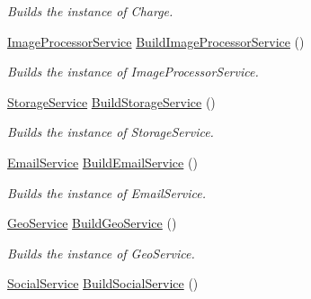\begin{DoxyCompactItemize}
\begin{DoxyCompactList}\small\item\em Builds the instance of Charge. \end{DoxyCompactList}\item 
\hyperlink{classcom_1_1shephertz_1_1app42_1_1paas_1_1sdk_1_1csharp_1_1image_processor_1_1_image_processor_service}{Image\+Processor\+Service} \hyperlink{classcom_1_1shephertz_1_1app42_1_1paas_1_1sdk_1_1csharp_1_1_service_a_p_i_a211f56b5ec6b88fbd4311e5588f5459b}{Build\+Image\+Processor\+Service} ()
\begin{DoxyCompactList}\small\item\em Builds the instance of Image\+Processor\+Service. \end{DoxyCompactList}\item 
\hyperlink{classcom_1_1shephertz_1_1app42_1_1paas_1_1sdk_1_1csharp_1_1storage_1_1_storage_service}{Storage\+Service} \hyperlink{classcom_1_1shephertz_1_1app42_1_1paas_1_1sdk_1_1csharp_1_1_service_a_p_i_a6095c7d2d004811386bfa8fec4c936de}{Build\+Storage\+Service} ()
\begin{DoxyCompactList}\small\item\em Builds the instance of Storage\+Service. \end{DoxyCompactList}\item 
\hyperlink{classcom_1_1shephertz_1_1app42_1_1paas_1_1sdk_1_1csharp_1_1email_1_1_email_service}{Email\+Service} \hyperlink{classcom_1_1shephertz_1_1app42_1_1paas_1_1sdk_1_1csharp_1_1_service_a_p_i_a72523c209e434971042ccc9545e2d83f}{Build\+Email\+Service} ()
\begin{DoxyCompactList}\small\item\em Builds the instance of Email\+Service. \end{DoxyCompactList}\item 
\hyperlink{classcom_1_1shephertz_1_1app42_1_1paas_1_1sdk_1_1csharp_1_1geo_1_1_geo_service}{Geo\+Service} \hyperlink{classcom_1_1shephertz_1_1app42_1_1paas_1_1sdk_1_1csharp_1_1_service_a_p_i_a0546974e603183b01afda171e3dbb3a3}{Build\+Geo\+Service} ()
\begin{DoxyCompactList}\small\item\em Builds the instance of Geo\+Service. \end{DoxyCompactList}\item 
\hyperlink{classcom_1_1shephertz_1_1app42_1_1paas_1_1sdk_1_1csharp_1_1social_1_1_social_service}{Social\+Service} \hyperlink{classcom_1_1shephertz_1_1app42_1_1paas_1_1sdk_1_1csharp_1_1_service_a_p_i_a68d5f0709c8769201fdda8acc3a1e30c}{Build\+Social\+Service} ()

\end{DoxyCompactItemize}

